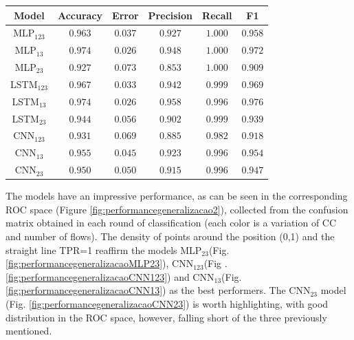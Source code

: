 \documentclass[a4paper,fleqn]{cas-sc}
\begin{document}
\begin{minipage}{0.45\textwidth}
	\vspace{0.5cm}
	\begingroup
	\begin{tiny}	
		\setlength{\tabcolsep}{3pt}
		\renewcommand{\arraystretch}{1.15}
		
		
		\begin{tabular*}{\textwidth}{@{} CCCCCC@{} }
			\toprule
			Model&Accuracy&Error&Precision&Recall&F1 \\
			\midrule
				MLP$_{123}$ & $0.963$ & $0.037$ & $0.927$ & $1.000$ & $0.958$ \\
				MLP$_{13}$ & $0.974$ & $0.026$ & $0.948$ & $1.000$ & $0.972$ \\
				MLP$_{23}$ & $0.927$ & $0.073$ & $0.853$ & $1.000$ & $0.909$ \\
				LSTM$_{123}$ & $0.967$ & $0.033$ & $0.942$ & $0.999$ & $0.969$ \\
				LSTM$_{13}$ & $0.974$ & $0.026$ & $0.958$ & $0.996$ & $0.976$ \\
				LSTM$_{23}$ & $0.944$ & $0.056$ & $0.902$ & $0.999$ & $0.939$ \\
				CNN$_{123}$ & $0.931$ & $0.069$ & $0.885$ & $0.982$ & $0.918$ \\
				CNN$_{13}$ & $0.955$ & $0.045$ & $0.923$ & $0.996$ & $0.954$ \\
				CNN$_{23}$ & $0.950$ & $0.050$ & $0.915$ & $0.996$ & $0.947$ \\
			\bottomrule
		\end{tabular*}
		\vspace{-0.3cm}
		\label{tab:metricas_generalizacao_1000Mbps_teste}
	\end{tiny}
	\endgroup	
\end{minipage}

The models have an impressive performance, as can be seen in the corresponding ROC space (Figure \ref{fig:performancegeneralizacao2}), collected from the confusion matrix obtained in each round of classification (each color is a variation of CC and number of flows). The density of points around the position (0,1) and the straight line TPR=1 reaffirm the models MLP$_{23}$(Fig.\ref{fig:performancegeneralizacaoMLP23}), CNN$_{123}$(Fig . \ref{fig:performancegeneralizacaoCNN123}) and CNN$_{13}$(Fig. \ref{fig:performancegeneralizacaoCNN13}) as the best performers. The CNN$_{23}$ model (Fig. \ref{fig:performancegeneralizacaoCNN23}) is worth highlighting, with good distribution in the ROC space, however, falling short of the three previously mentioned.
\end{document}

